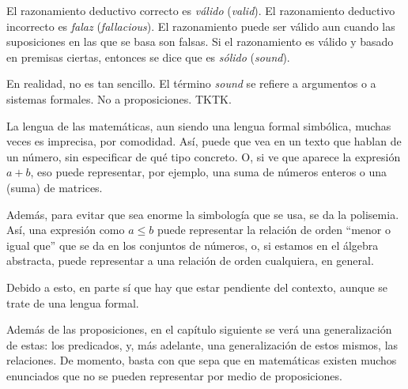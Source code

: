El razonamiento deductivo correcto es \emph{válido} (\emph{valid}). El
razonamiento deductivo incorrecto es \emph{falaz} (\emph{fallacious}). El
razonamiento puede ser válido aun cuando las suposiciones en las que se basa
son falsas. Si el razonamiento es válido y basado en premisas ciertas,
entonces se dice que es \emph{sólido} (\emph{sound}).

En realidad, no es tan sencillo. El término \emph{sound} se refiere a
argumentos o a sistemas formales. No a proposiciones. TKTK.





La lengua de las matemáticas, aun siendo una lengua formal simbólica, muchas
veces es imprecisa, por comodidad. Así, puede que vea en un texto que hablan
de un número, sin especificar de qué tipo concreto. O, si ve que aparece la
expresión $a + b$, eso puede representar, por ejemplo, una suma de números
enteros o una (suma) de matrices.

Además, para evitar que sea enorme la simbología que se usa, se da la
polisemia. Así, una expresión como $a \leq b$ puede representar la relación
de orden ``menor o igual que'' que se da en los conjuntos de números, o, si
estamos en el álgebra abstracta, puede representar a una relación de orden
cualquiera, en general.

Debido a esto, en parte sí que hay que estar pendiente del contexto, aunque
se trate de una lengua formal.






\iffalse

Las proposiciones son lo que constituye los \emph{argumentos}
(\emph{arguments}) en la lógica. Estos no son más que TKTK. En matemáticas,
un argumento podría ser, por ejemplo, una demostración de un teorema. Esta
no es más que una proposición compuesta con varios niveles de anidamiento.

Todo esto se explica en \emph{An Introduction to Formal Logic} de Peter
Smith. En el capítulo 7, titulado \emph{Propositions and forms}. Aunque
seguramente sea demasiado para una asignatura de este tipo. No se necesita
tener una definición rigurosa del concepto de \emph{proposición}.

\fi



Además de las proposiciones, en el capítulo siguiente se verá una
generalización de estas: los predicados, y, más adelante, una generalización
de estos mismos, las relaciones. De momento, basta con que sepa que en
matemáticas existen muchos enunciados que no se pueden representar por medio
de proposiciones.





